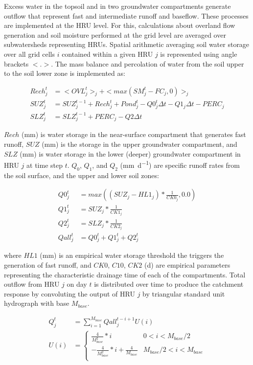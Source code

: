 Excess water in the topsoil and in two groundwater compartments generate outflow that represent fast and intermediate runoff and baseflow. These processes are implemented at the HRU level. For this, calculations about overland flow generation and soil moisture performed at the grid level are averaged over subwatersheds representing HRUs. Spatial arithmetic averaging soil water storage over all grid cells $i$ contained within a given HRU $j$ is represented using angle brackets $<.>$. The mass balance and percolation of water from the soil upper to the soil lower zone is implemented as:

\begin{align}
Rech_j^t &= <OVL_j^t>_j + <max(SM_j^t - FC_j, 0)>_j\\
SUZ_j^t &= SUZ_j^{t-1} + Rech_j^t + Pond_j^t - Q0_j^t\Delta t - Q1_j\Delta t - PERC_j\\
SLZ_j^t &= SLZ_j^{t-1} + PERC_j - Q2 \Delta t
\end{align}

\noindent $Rech$ (\si{\milli\meter}) is water storage in the near-surface compartment that generates fast runoff, $SUZ$ (\si{\milli\meter}) is the storage in the upper groundwater compartment, and $SLZ$ (\si{\milli\meter}) is water storage in the lower (deeper) groundwater compartment in HRU $j$ at time step $t$. $Q_0$, $Q_1$, and $Q_2$ (\si{\milli\meter\per\day}) are specific runoff rates from the soil surface, and the upper and lower soil zones:

\begin{align}
Q0_j^t &= max((SUZ_j - HL1_j) * \frac{1}{CK0_j}, 0.0)\\
Q1_j^t &= SUZ_j * \frac{1}{CK1_j}\\
Q2_j^t &= SLZ_j * \frac{1}{CK2_j}\\
Qall_j^t &= Q0_j^t + Q1_j^t + Q2_j^t
\end{align}

\noindent where $HL1$ (\si{\milli\meter}) is an empirical water storage threshold the triggers the generation of fast runoff, and $CK0$, $C10$, $CK2$ (\si{\day}) are empirical parameters representing the characteristic drainage time of each of the compartments.
Total outflow from HRU $j$ on day $t$ is distributed over time to produce the catchment response by convoluting the output of HRU $j$ by triangular standard unit hydrograph with base $M_{base}$.

\begin{align}
Q_j^t &= \sum_{i=1}^{M_{base}} Qall_j^{t-i+1} U(i) \\
U(i) &= \left\{
\begin{array}{ll}
\frac{4}{M_{base}^2}*i & 0 < i < M_{base}/2 \\
-\frac{4}{M_{base}^2}*i + \frac{4}{M_{base}} &  M_{base}/2 < i < M_{base} \\
\end{array}
\right.
\end{align}

